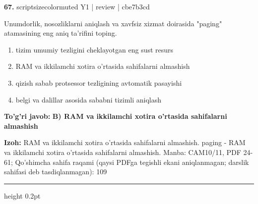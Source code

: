 \documentclass[10pt,a4paper]{article}
\begin{document}
{\bfseries\sffamily\color{ink} 67.} {scriptsizecolor{muted} Y1 | review | cbe7b3cd}
\par
Unumdorlik, nosozliklarni aniqlash va xavfsiz xizmat doirasida "paging" atamasining eng aniq ta'rifini toping.
\begin{enumerate}[label=\Alph*),leftmargin=9mm]
\item tizim umumiy tezligini cheklayotgan eng sust resurs
\item RAM va ikkilamchi xotira o'rtasida sahifalarni almashish
\item qizish sabab protsessor tezligining avtomatik pasayishi
\item belgi va dalillar asosida sababni tizimli aniqlash
\end{enumerate}
\begin{tcolorbox}[enhanced,breakable,colback=teal!4,colframe=teal!60!black,boxrule=0.45pt,arc=1.2mm,left=2.7mm,right=2.7mm,top=1.8mm,bottom=1.8mm,before skip=2mm,after skip=2mm]
{\bfseries\sffamily\color{teal}To'g'ri javob:} \textbf{B) RAM va ikkilamchi xotira o'rtasida sahifalarni almashish}
\par\smallskip
{\bfseries Izoh:} RAM va ikkilamchi xotira o'rtasida sahifalarni almashish. paging - RAM va ikkilamchi xotira o'rtasida sahifalarni almashish. Manba: CAM10/11, PDF 24-61; Qo'shimcha sahifa raqami (qaysi PDFga tegishli ekani aniqlanmagan; darslik sahifasi deb tasdiqlanmagan): 109
\end{tcolorbox}
\vspace{2mm}\hrule height 0.2pt\vspace{3mm}
\end{document}
